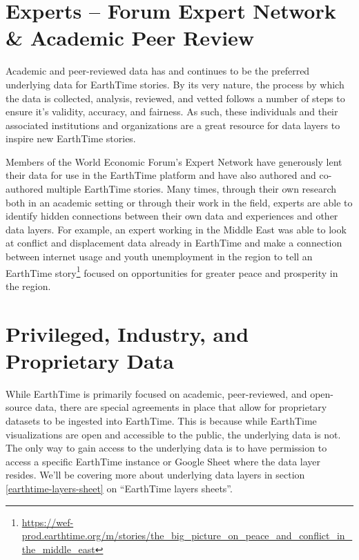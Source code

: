 \documentclass[
]{krantz}
\renewcommand{\href}[2]{#2\footnote{\url{#1}}}
\begin{document}
\hypertarget{experts-forum-expert-network-academic-peer-review}{%
\section{Experts -- Forum Expert Network \& Academic Peer Review}\label{experts-forum-expert-network-academic-peer-review}}

Academic and peer-reviewed data has and continues to be the preferred underlying data for EarthTime stories. By its very nature, the process by which the data is collected, analysis, reviewed, and vetted follows a number of steps to ensure it's validity, accuracy, and fairness. As such, these individuals and their associated institutions and organizations are a great resource for data layers to inspire new EarthTime stories.

Members of the World Economic Forum's Expert Network have generously lent their data for use in the EarthTime platform and have also authored and co-authored multiple EarthTime stories. Many times, through their own research both in an academic setting or through their work in the field, experts are able to identify hidden connections between their own data and experiences and other data layers. For example, an expert working in the Middle East was able to look at conflict and displacement data already in EarthTime and make a connection between internet usage and youth unemployment in the region to tell an \href{https://wef-prod.earthtime.org/m/stories/the_big_picture_on_peace_and_conflict_in_the_middle_east}{EarthTime story} focused on opportunities for greater peace and prosperity in the region.

\hypertarget{privileged-industry-and-proprietary-data}{%
\section{Privileged, Industry, and Proprietary Data}\label{privileged-industry-and-proprietary-data}}

While EarthTime is primarily focused on academic, peer-reviewed, and open-source data, there are special agreements in place that allow for proprietary datasets to be ingested into EarthTime. This is because while EarthTime visualizations are open and accessible to the public, the underlying data is not. The only way to gain access to the underlying data is to have permission to access a specific EarthTime instance or Google Sheet where the data layer resides. We'll be covering more about underlying data layers in section \ref{earthtime-layers-sheet} on ``EarthTime layers sheets''.
\end{document}
